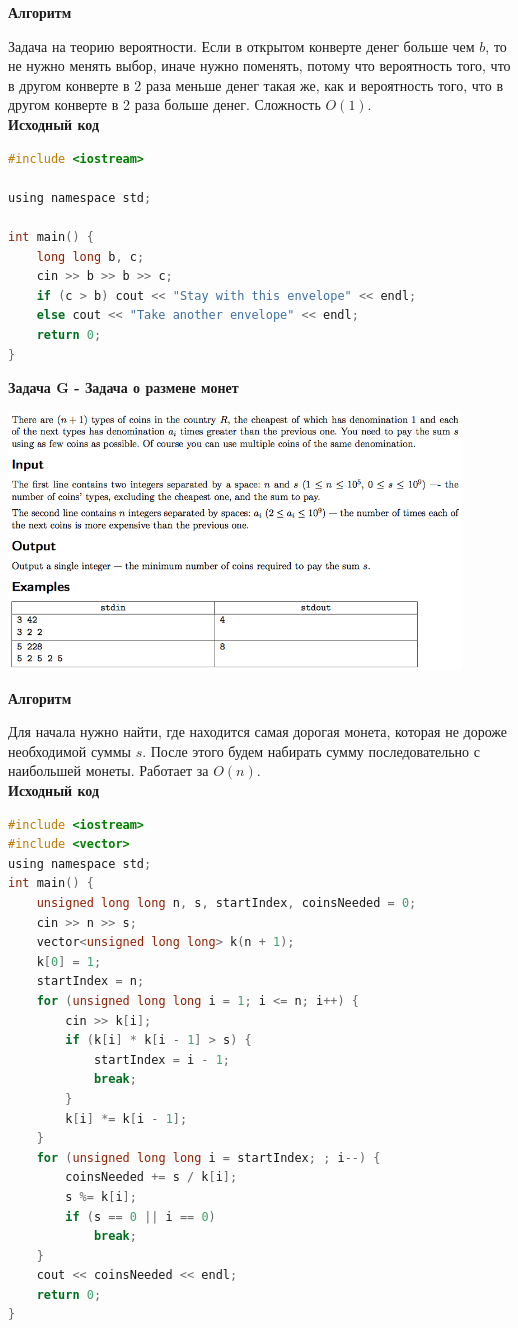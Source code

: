 \documentclass[a4paper,12pt]{article}
\begin{document}
\textbf{{\large Алгоритм}}

Задача на теорию вероятности. Если в открытом конверте денег больше чем $b$, то не нужно менять выбор, иначе нужно поменять, потому что вероятность того, что в другом конверте в 2 раза меньше денег такая же, как и вероятность того, что в другом конверте в 2 раза больше денег. Сложность $O(1)$.\\

\textbf{{\large Исходный код}} \\
\begin{lstlisting}[language=C]
#include <iostream>

using namespace std;

int main() {
    long long b, c;
    cin >> b >> b >> c;
    if (c > b) cout << "Stay with this envelope" << endl;
    else cout << "Take another envelope" << endl;
    return 0;
}
\end{lstlisting}

\newpage
\textbf{{\large Задача G - Задача о размене монет}}

\begin{center}
\includegraphics[width=0.9\textwidth]{CT_SGAU/CT_SGAU_G.png}\\ [1cm]
\end{center}

\textbf{{\large Алгоритм}}

Для начала нужно найти, где находится самая дорогая монета, которая не дороже необходимой суммы $s$. После этого будем набирать сумму последовательно с наибольшей монеты. Работает за $O(n)$. \\

\textbf{{\large Исходный код}} \\
\begin{lstlisting}[language=C]
#include <iostream>
#include <vector>
using namespace std;
int main() {
    unsigned long long n, s, startIndex, coinsNeeded = 0;
    cin >> n >> s;
    vector<unsigned long long> k(n + 1);
    k[0] = 1;
    startIndex = n;
    for (unsigned long long i = 1; i <= n; i++) {
        cin >> k[i];
        if (k[i] * k[i - 1] > s) {
            startIndex = i - 1;
            break;
        }
        k[i] *= k[i - 1];
    }
    for (unsigned long long i = startIndex; ; i--) {
        coinsNeeded += s / k[i];
        s %= k[i];
        if (s == 0 || i == 0)
            break;
    }
    cout << coinsNeeded << endl;
    return 0;
}
\end{lstlisting}
\end{document}
